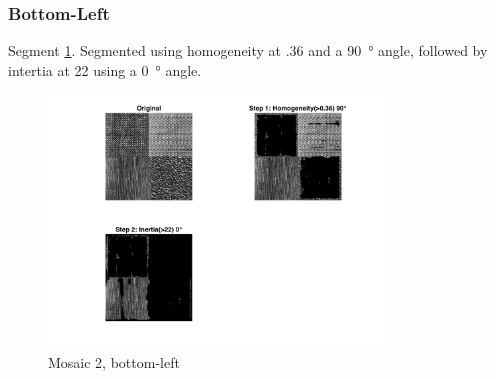 \documentclass[a4paper,12pt,titlepage]{article}
\begin{document}
\subsubsection*{Bottom-Left}
Segment \ref{fig:Mosaic2SegmentedBottomLeft}. Segmented using homogeneity at .36 and a \SI{90}{\degree} angle, followed by intertia at 22 using a \SI{0}{\degree} angle.

\begin{figure}[H]
	\includegraphics[width=0.8\textwidth]{partD-mosaic2-segmentation-bottom-left}
	\caption{Mosaic 2, bottom-left}
	\label{fig:Mosaic2SegmentedBottomLeft}
\end{figure}
\end{document}
